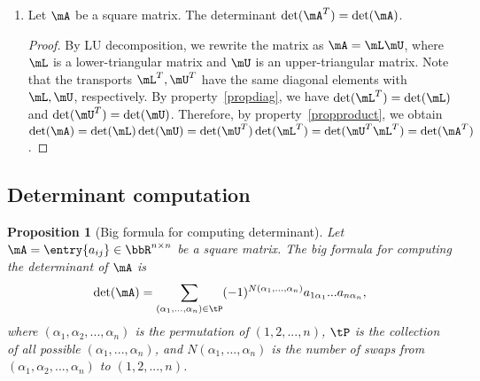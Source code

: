 \documentclass[11pt]{article}
\theoremstyle{plain}
\newtheorem{prop}{Proposition}
\theoremstyle{definition}
\begin{document}
\begin{enumerate}
	\item\label{proptrans} Let $\mA$ be a square matrix. The determinant $\det(\mA^T) = \det(\mA)$. 
	
	\begin{proof}
		By LU decomposition, we rewrite the matrix as $\mA = \mL \mU$, where $\mL$ is a lower-triangular matrix and $\mU$ is an upper-triangular matrix. Note that the transports $\mL^T,\mU^T$ have the same diagonal elements with $\mL, \mU$, respectively. By property~\ref{propdiag}, we have $\det(\mL^T)= \det(\mL)$ and $  \det(\mU^T) = \det(\mU)$. Therefore, by property~\ref{propproduct}, we obtain  $\det(\mA) = \det(\mL) \det(\mU) = \det(\mU^T) \det(\mL^T) = \det(\mU^T \mL^T) = \det(\mA^T)$. 
			\end{proof}
\end{enumerate}

\subsection{Determinant computation}
\begin{prop}[Big formula for computing determinant]
	Let  $\mA = \entry{a_{ij}} \in \bbR^{n \times n}$ be a square matrix. The big formula for computing the determinant of $\mA$ is
	\[ \det(\mA) =  \sum_{(\alpha_1,...,\alpha_n) \in \tP} (-1)^{N(\alpha_1,...,\alpha_n)} a_{1\alpha_1} ... a_{n \alpha_n},  \]
	where $(\alpha_1, \alpha_2, ...,\alpha_n)$ is the permutation of $(1,2,...,n)$, $\tP$ is the collection of all possible  $(\alpha_1,...,\alpha_n)$, and $N(\alpha_1,...,\alpha_n)$ is the number of swaps from $(\alpha_1,\alpha_2,...,\alpha_n)$  to $(1,2,...,n)$. 
\end{prop}
\end{document}
